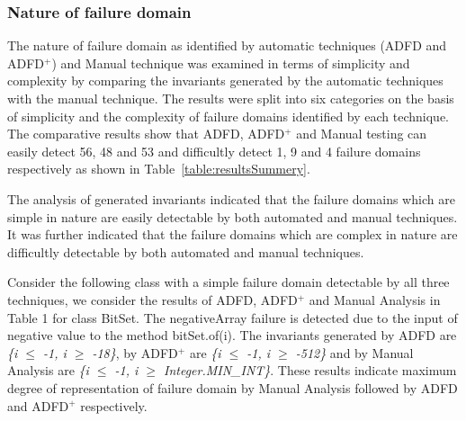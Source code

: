 
\subsubsection{Nature of failure domain} \label{sec:nature}
The nature of failure domain as identified by automatic techniques (ADFD and ADFD$^+$) and Manual technique was examined in terms of simplicity and complexity by comparing the invariants generated by the automatic techniques with the manual technique. The results were split into six categories on the basis of simplicity and the complexity of failure domains identified by each technique. The comparative results show that ADFD, ADFD$^+$ and Manual testing can easily detect 56, 48 and 53 and difficultly detect 1, 9 and 4 failure domains respectively as shown in Table~\ref{table:resultsSummery}.

The analysis of generated invariants indicated that the failure domains which are simple in nature are easily detectable by both automated and manual techniques. It was further indicated that the failure domains which are complex in nature are difficultly detectable by both automated and manual techniques. %

Consider the following class with a simple failure domain detectable by all three techniques, we consider the results of ADFD, ADFD$^+$ and Manual Analysis in Table 1 for class BitSet. The negativeArray failure is detected due to the input of negative value to the method bitSet.of(i). The invariants generated by ADFD are \textit{\{i $\le$ -1, i $\ge$ -18\}}, by ADFD$^+$ are \textit{\{i $\le$ -1, i $\ge$ -512\}} and by Manual Analysis are \textit{\{i $\le$ -1, i $\ge$ Integer.MIN\_INT\}}. These results indicate maximum degree of representation of failure domain by Manual Analysis followed by ADFD and ADFD$^+$ respectively.


